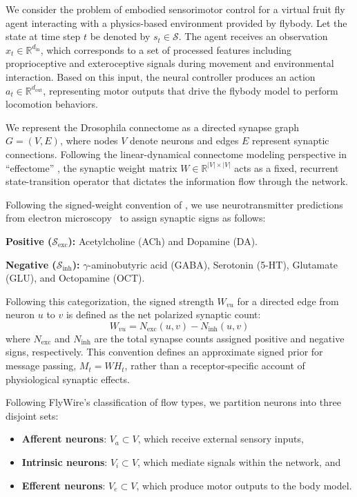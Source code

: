 \documentclass[a4paper]{easychair}
\begin{document}
We consider the problem of embodied sensorimotor control for a virtual fruit fly agent interacting with a physics-based environment provided by flybody. Let the state at time step $t$ be denoted by $s_t \in \mathcal{S}$. The agent receives an observation $x_t \in \mathbb{R}^{d_{\text{in}}}$, which corresponds to a set of processed features including proprioceptive and exteroceptive signals during movement and environmental interaction. Based on this input, the neural controller produces an action $a_t \in \mathbb{R}^{d_{\text{out}}}$, representing motor outputs that drive the flybody model to perform locomotion behaviors.

We represent the Drosophila connectome as a directed synapse graph $G=(V,E)$, where nodes $V$ denote neurons and edges $E$ represent synaptic connections. Following the linear-dynamical connectome modeling perspective in ``effectome'' \citep{Pospisil2024}, the synaptic weight matrix $W \in \mathbb{R}^{|V| \times |V|}$ acts as a fixed, recurrent state-transition operator that dictates the information flow through the network.

Following the signed-weight convention of \citet{Pospisil2024}, we use neurotransmitter predictions from electron microscopy~\citep{Eckstein2024a} to assign synaptic signs as follows:

\textbf{Positive ($\mathcal{S}_{\text{exc}}$):} Acetylcholine (ACh) and Dopamine (DA).

\textbf{Negative ($\mathcal{S}_{\text{inh}}$):} $\gamma$-aminobutyric acid (GABA), Serotonin (5-HT), Glutamate (GLU), and Octopamine (OCT).

Following this categorization, the signed strength $W_{vu}$ for a directed edge from neuron $u$ to $v$ is defined as the net polarized synaptic count:
\begin{equation}
    W_{vu} = N_{\text{exc}}(u, v) - N_{\text{inh}}(u, v)
\end{equation}
where $N_{\text{exc}}$ and $N_{\text{inh}}$ are the total synapse counts assigned positive and negative signs, respectively. This convention defines an approximate signed prior for message passing, $M_t = W H_t$, rather than a receptor-specific account of physiological synaptic effects.

Following FlyWire's classification of flow types, we partition neurons into three disjoint sets:
\begin{itemize}
\setlength{\itemsep}{0pt}
\setlength{\parsep}{0pt}
\setlength{\parskip}{0pt}
\item \textbf{Afferent neurons}: $V_a \subset V$, which receive external sensory inputs,
\item \textbf{Intrinsic neurons}: $V_i \subset V$, which mediate signals within the network, and
\item \textbf{Efferent neurons}: $V_e \subset V$, which produce motor outputs to the body model.
\end{itemize}
\end{document}
